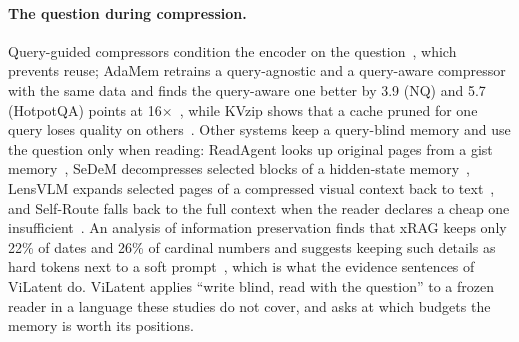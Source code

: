\paragraph{The question during compression.}
Query-guided compressors condition the encoder on the question~\cite{cao2024qgc,louis2025oscar}, which prevents reuse; AdaMem retrains a query-agnostic and a query-aware compressor with the same data and finds the query-aware one better by 3.9 (NQ) and 5.7 (HotpotQA) points at 16$\times$~\cite{sakhno2026adamem}, while KVzip shows that a cache pruned for one query loses quality on others~\cite{kim2025kvzip}.
Other systems keep a query-blind memory and use the question only when reading: ReadAgent looks up original pages from a gist memory~\cite{lee2024readagent}, SeDeM decompresses selected blocks of a hidden-state memory~\cite{haghifam2026sedem}, LensVLM expands selected pages of a compressed visual context back to text~\cite{xie2026lensvlm}, and Self-Route falls back to the full context when the reader declares a cheap one insufficient~\cite{li2024selfroute}.
An analysis of information preservation finds that xRAG keeps only 22\% of dates and 26\% of cardinal numbers and suggests keeping such details as hard tokens next to a soft prompt~\cite{lajewska2025information}, which is what the evidence sentences of ViLatent do.
ViLatent applies ``write blind, read with the question'' to a frozen reader in a language these studies do not cover, and asks at which budgets the memory is worth its positions.
